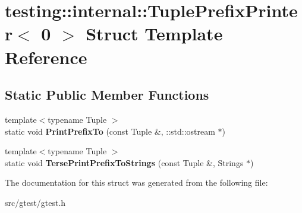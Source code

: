 \hypertarget{structtesting_1_1internal_1_1_tuple_prefix_printer_3_010_01_4}{}\section{testing\+:\+:internal\+:\+:Tuple\+Prefix\+Printer$<$ 0 $>$ Struct Template Reference}
\label{structtesting_1_1internal_1_1_tuple_prefix_printer_3_010_01_4}
\subsection*{Static Public Member Functions}
\begin{DoxyCompactItemize}
\item 
\mbox{\label{structtesting_1_1internal_1_1_tuple_prefix_printer_3_010_01_4_a6c8435142294685c1a4b7248ec37ad35}} 
{\footnotesize template$<$typename Tuple $>$ }\\static void {\bfseries Print\+Prefix\+To} (const Tuple \&, \+::std\+::ostream $\ast$)
\item 
\mbox{\label{structtesting_1_1internal_1_1_tuple_prefix_printer_3_010_01_4_a634e1811ae45ef3f02e3559a5c28e999}} 
{\footnotesize template$<$typename Tuple $>$ }\\static void {\bfseries Terse\+Print\+Prefix\+To\+Strings} (const Tuple \&, Strings $\ast$)
\end{DoxyCompactItemize}


The documentation for this struct was generated from the following file\+:\begin{DoxyCompactItemize}
\item 
src/gtest/gtest.\+h\end{DoxyCompactItemize}
